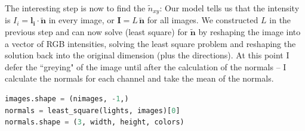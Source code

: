 \documentclass{paper}
\begin{document}
The interesting step is now to find the $\tilde{n}_{xy}$: Our model tells us that the intensity is $I_i=\mathbf{l_i}\cdot \mathbf{\tilde{n}}$ in every image, or $\mathbf{I}=L\,\mathbf{\tilde{n}}$ for all images. We constructed $L$ in the previous step and can now solve (least square) for $\mathbf{\tilde{n}}$ by reshaping the image into a vector of RGB intensities, solving the least square problem and reshaping the solution back into the original dimension (plus the directions). At this point I defer the ``greying" of the image until after the calculation of the normals -- I calculate the normals for each channel and take the mean of the normals.
\begin{lstlisting}[language=Python]
images.shape = (nimages, -1,)
normals = least_square(lights, images)[0]
normals.shape = (3, width, height, colors)
\end{lstlisting}
\end{document}
